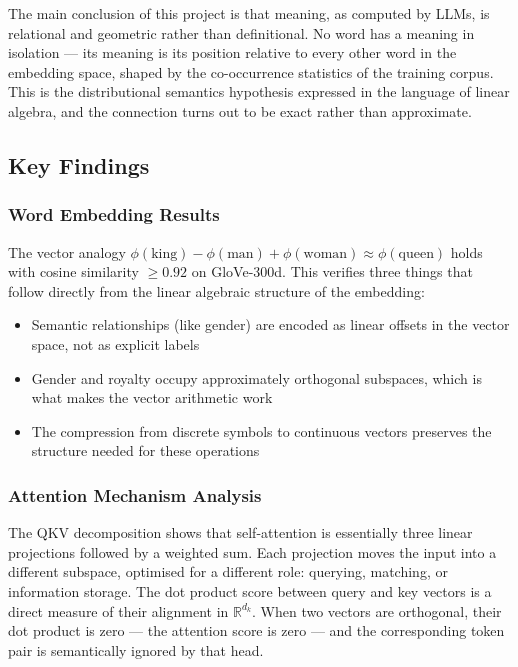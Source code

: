 \documentclass[12pt,a4paper]{article}
\begin{document}
The main conclusion of this project is that meaning, as computed by LLMs, is relational
and geometric rather than definitional. No word has a meaning in isolation --- its meaning
is its position relative to every other word in the embedding space, shaped by the
co-occurrence statistics of the training corpus. This is the distributional semantics
hypothesis expressed in the language of linear algebra, and the connection turns out to
be exact rather than approximate.

\subsection{Key Findings}

\subsubsection{Word Embedding Results}

The vector analogy
$\phi(\text{king}) - \phi(\text{man}) + \phi(\text{woman}) \approx \phi(\text{queen})$
holds with cosine similarity $\geq 0.92$ on GloVe-300d. This verifies three things that
follow directly from the linear algebraic structure of the embedding:

\begin{itemize}[itemsep=4pt]
    \item Semantic relationships (like gender) are encoded as linear offsets in the
          vector space, not as explicit labels
    \item Gender and royalty occupy approximately orthogonal subspaces, which is what
          makes the vector arithmetic work
    \item The compression from discrete symbols to continuous vectors preserves the
          structure needed for these operations
\end{itemize}

\subsubsection{Attention Mechanism Analysis}

The QKV decomposition shows that self-attention is essentially three linear projections
followed by a weighted sum. Each projection moves the input into a different subspace,
optimised for a different role: querying, matching, or information storage. The dot product
score between query and key vectors is a direct measure of their alignment in $\mathbb{R}^{d_k}$.
When two vectors are orthogonal, their dot product is zero --- the attention score is
zero --- and the corresponding token pair is semantically ignored by that head.
\end{document}
